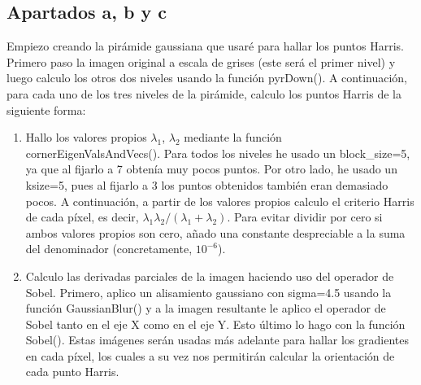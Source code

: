 \documentclass[10pt,a4paper]{article}
\begin{document}
\subsection{Apartados a, b y c}
Empiezo creando la pirámide gaussiana que usaré para hallar los puntos Harris. Primero paso la imagen original a escala de grises (este será el primer nivel) y luego calculo los otros dos niveles usando la función pyrDown(). A continuación, para cada uno de los tres niveles de la pirámide, calculo los puntos Harris de la siguiente forma:
\begin{enumerate}
	\item Hallo los valores propios $\lambda_1$, $\lambda_2$ mediante la función cornerEigenValsAndVecs(). Para todos los niveles he usado un block\_size=5, ya que al fijarlo a 7 obtenía muy pocos puntos. Por otro lado, he usado un ksize=5, pues al fijarlo a 3 los puntos obtenidos también eran demasiado pocos. A continuación, a partir de los valores propios calculo el criterio Harris de cada píxel, es decir, $\lambda_1 \lambda_2 / (\lambda_1 + \lambda_2)$. Para evitar dividir por cero si ambos valores propios son cero, añado una constante despreciable a la suma del denominador (concretamente, $10^{-6}$).
	
	\item Calculo las derivadas parciales de la imagen haciendo uso del operador de Sobel. Primero, aplico un alisamiento gaussiano con sigma=4.5 usando la función GaussianBlur() y a la imagen resultante le aplico el operador de Sobel tanto en el eje X como en el eje Y. Esto último lo hago con la función Sobel(). Estas imágenes serán usadas más adelante para hallar los gradientes en cada píxel, los cuales a su vez nos permitirán calcular la orientación de cada punto Harris.
	

\end{enumerate}
\end{document}

